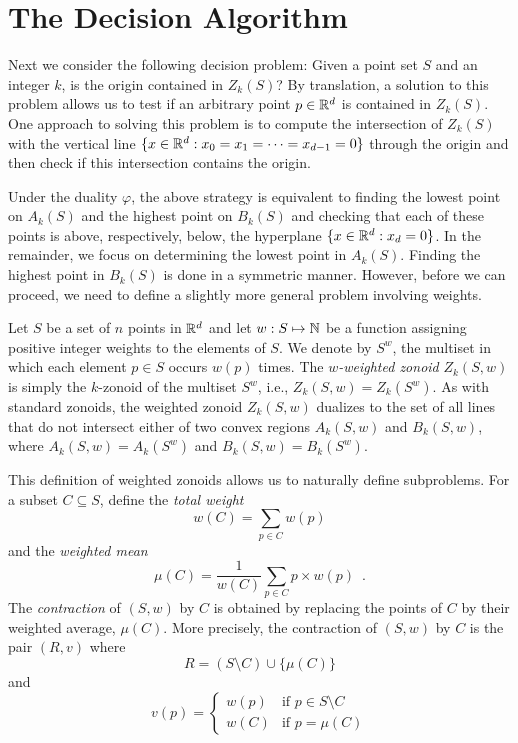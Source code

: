 \documentclass[lotsofwhite]{patmorin}
\newcommand{\dual}{\varphi}
\begin{document}
\section{The Decision Algorithm}

Next we consider the following decision problem:  Given a point set
$S$ and an integer $k$, is the origin contained in $Z_k(S)$?  By
translation, a solution to this problem allows us to test if an
arbitrary point $p\in\mathbb{R}^d$ is contained in $Z_k(S)$. One approach to
solving this problem is to compute the intersection of $Z_k(S)$ with
the vertical line $\{x\in\mathbb{R}^d:x_0=x_1=\cdots=x_{d-1}=0\}$ through the origin
and then check if this intersection contains the origin.

Under the duality $\dual$, the above strategy is equivalent to finding
the lowest point on $A_k(S)$ and the highest point on $B_k(S)$ and
checking that each of these points is above, respectively, below, the
hyperplane $\{x\in\mathbb{R}^d:x_d=0\}$.  In the remainder, we focus on
determining the lowest point in $A_k(S)$.  Finding the highest point
in $B_k(S)$ is done in a symmetric manner.  However, before we can
proceed, we need to define a slightly more general problem involving
weights.

Let $S$ be a set of $n$ points in $\mathbb{R}^d$ and let $w:S\mapsto\mathbb{N}$ be a
function assigning positive integer weights to the elements of $S$.
We denote by $S^w$, the multiset in which each element $p\in S$ occurs
$w(p)$ times.  The \emph{$w$-weighted zonoid} $Z_k(S,w)$ is simply the
$k$-zonoid of the multiset $S^w$, i.e., $Z_k(S,w)=Z_k(S^w)$.  As with
standard zonoids, the weighted zonoid $Z_k(S,w)$ dualizes to the set
of all lines that do not intersect either of two convex regions
$A_k(S,w)$ and $B_k(S,w)$, where $A_k(S,w)=A_k(S^w)$ and
$B_k(S,w)=B_k(S^w)$.

This definition of weighted zonoids allows us to naturally define
subproblems.  For a subset $C\subseteq S$, define the \emph{total
weight}
\[
       w(C)=\sum_{p\in C}w(p)
\]
and the \emph{weighted mean}
\[ 
       \mu(C)=\frac{1}{w(C)}\sum_{p\in C} p\times w(p) \enspace .
\]
The \emph{contraction} of
$(S,w)$ by $C$ is obtained by replacing the points of $C$ by their
weighted average, $\mu(C)$.  More precisely, the contraction of
$(S,w)$ by $C$ is the pair $(R,v)$ where 
\[ R = (S\setminus C) \cup \{ \mu(C) \} \] 
and 
\[ v(p) = \left\{\begin{array}{ll} 
        w(p) & \mbox{if $p\in S\setminus C$} \\ 
        w(C) & \mbox{if $p=\mu(C)$} \end{array}\right.
\]
\end{document}
